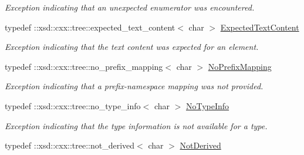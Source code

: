 \begin{DoxyCompactItemize}
\begin{DoxyCompactList}\small\item\em Exception indicating that an unexpected enumerator was encountered. \item\end{DoxyCompactList}\item 
\hypertarget{namespacexml__schema_ae1126b64dc28661806114ccce3a9a568}{
typedef ::xsd::cxx::tree::expected\_\-text\_\-content$<$ char $>$ \hyperlink{namespacexml__schema_ae1126b64dc28661806114ccce3a9a568}{ExpectedTextContent}}
\label{namespacexml__schema_ae1126b64dc28661806114ccce3a9a568}

\begin{DoxyCompactList}\small\item\em Exception indicating that the text content was expected for an element. \item\end{DoxyCompactList}\item 
\hypertarget{namespacexml__schema_ac1001885bc0f0942758a60c65c028058}{
typedef ::xsd::cxx::tree::no\_\-prefix\_\-mapping$<$ char $>$ \hyperlink{namespacexml__schema_ac1001885bc0f0942758a60c65c028058}{NoPrefixMapping}}
\label{namespacexml__schema_ac1001885bc0f0942758a60c65c028058}

\begin{DoxyCompactList}\small\item\em Exception indicating that a prefix-\/namespace mapping was not provided. \item\end{DoxyCompactList}\item 
\hypertarget{namespacexml__schema_a7a2506434a2f51df9fee6ec7dc0ad12e}{
typedef ::xsd::cxx::tree::no\_\-type\_\-info$<$ char $>$ \hyperlink{namespacexml__schema_a7a2506434a2f51df9fee6ec7dc0ad12e}{NoTypeInfo}}
\label{namespacexml__schema_a7a2506434a2f51df9fee6ec7dc0ad12e}

\begin{DoxyCompactList}\small\item\em Exception indicating that the type information is not available for a type. \item\end{DoxyCompactList}\item 
\hypertarget{namespacexml__schema_af5fd843f86d4a67881d295326ee79bf4}{
typedef ::xsd::cxx::tree::not\_\-derived$<$ char $>$ \hyperlink{namespacexml__schema_af5fd843f86d4a67881d295326ee79bf4}{NotDerived}}
\label{namespacexml__schema_af5fd843f86d4a67881d295326ee79bf4}


\end{DoxyCompactItemize}
